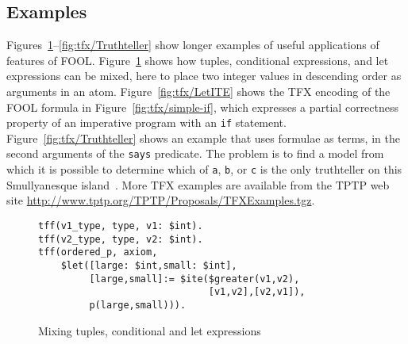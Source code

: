 \subsection{Examples}
\label{sec:tfx/Examples}

Figures~\ref{fig:tfx/TupleConditionalLet}--\ref{fig:tfx/Truthteller} show longer examples of
useful applications of features of FOOL. 
Figure~\ref{fig:tfx/TupleConditionalLet} shows how tuples, conditional expressions, 
and let expressions can be mixed, here to place two integer values in 
descending order as arguments in an atom. 
Figure~\ref{fig:tfx/LetITE} shows the TFX encoding of the FOOL formula in 
Figure~\ref{fig:tfx/simple-if}, which expresses a partial correctness property 
of an imperative program with an \texttt{if} statement. 
Figure~\ref{fig:tfx/Truthteller} shows an example that uses formulae as terms, in 
the second arguments of the {\tt says} predicate. 
The problem is to find a model from which it is possible to determine which 
of {\tt a}, {\tt b}, or {\tt c} is the only truthteller on this Smullyanesque 
island~\cite{Smu78}. 
More TFX examples are available from the TPTP web site 
\url{http://www.tptp.org/TPTP/Proposals/TFXExamples.tgz}.


\begin{figure}[htbp]\centering
\begin{BVerbatim}
tff(v1_type, type, v1: $int).
tff(v2_type, type, v2: $int).
tff(ordered_p, axiom,
    $let([large: $int,small: $int],
         [large,small]:= $ite($greater(v1,v2),
                              [v1,v2],[v2,v1]),
         p(large,small))).
\end{BVerbatim}
\caption{Mixing tuples, conditional and let expressions}
\label{fig:tfx/TupleConditionalLet}
\end{figure}

